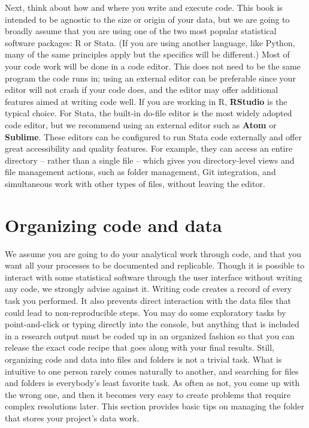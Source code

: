 Next, think about how and where you write and execute code.
This book is intended to be agnostic to the size or origin of your data,
but we are going to broadly assume that you are using 
one of the two most popular statistical software packages: R or Stata.
(If you are using another language, like Python,
many of the same principles apply but the specifics will be different.)
Most of your code work will be done in a code editor.
This does not need to be the same program the code runs in;
using an external editor can be preferable since your editor will not crash if your code does,
and the editor may offer additional features aimed at writing code well.
If you are working in R, \textbf{RStudio} is the typical choice.
For Stata, the built-in do-file editor is the most widely adopted code editor,
but we recommend using an external editor such as 
\textbf{Atom} or
\textbf{Sublime}.
These editors can be configured to run Stata code externally 
and offer great accessibility and quality features.
For example, they can access an entire directory -- rather than a single file --
which gives you directory-level views and file management actions,
such as folder management, Git integration,
and simultaneous work with other types of files, without leaving the editor.

\section{Organizing code and data}

We assume you are going to do your analytical work through code,
and that you want all your processes to be documented and replicable. 
Though it is possible to interact with some statistical software 
through the user interface without writing any code, 
we strongly advise against it.
Writing code creates a record of every task you performed.
It also prevents direct interaction with the data files that could lead to non-reproducible steps.
You may do some exploratory tasks by point-and-click or typing directly into the console,
but anything that is included in a research output
must be coded up in an organized fashion so that you can release
the exact code recipe that goes along with your final results.
Still, organizing code and data into files and folders is not a trivial task.
What is intuitive to one person rarely comes naturally to another,
and searching for files and folders is everybody's least favorite task.
As often as not, you come up with the wrong one,
and then it becomes very easy to create problems that require complex resolutions later.
This section provides basic tips on managing the folder
that stores your project's data work.

